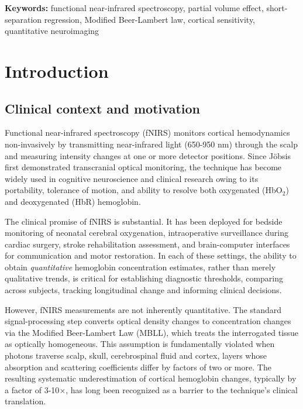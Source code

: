 \documentclass[11pt]{article}
\def\,{ }%
\begin{document}
\vspace{0.5em}\noindent\textbf{Keywords:} functional near-infrared spectroscopy, partial volume effect, short-separation regression, Modified Beer-Lambert law, cortical sensitivity, quantitative neuroimaging
\vspace{0.5em}

\section{Introduction}

\subsection{Clinical context and motivation}

\noindent Functional near-infrared spectroscopy (fNIRS) monitors cortical hemodynamics non-invasively by transmitting near-infrared light (650-950\,nm) through the scalp and measuring intensity changes at one or more detector positions\cite{r1,r2,r3}. Since J\"obsis\cite{r41} first demonstrated transcranial optical monitoring, the technique has become widely used in cognitive neuroscience and clinical research owing to its portability, tolerance of motion, and ability to resolve both oxygenated (HbO$_2$) and deoxygenated (HbR) hemoglobin.

The clinical promise of fNIRS is substantial. It has been deployed for bedside monitoring of neonatal cerebral oxygenation\cite{r4}, intraoperative surveillance during cardiac surgery\cite{r5}, stroke rehabilitation assessment\cite{r6}, and brain-computer interfaces for communication and motor restoration\cite{r7}. In each of these settings, the ability to obtain \textit{quantitative} hemoglobin concentration estimates, rather than merely qualitative trends, is critical for establishing diagnostic thresholds, comparing across subjects, tracking longitudinal change and informing clinical decisions\cite{r8}.

However, fNIRS measurements are not inherently quantitative. The standard signal-processing step converts optical density changes to concentration changes via the Modified Beer-Lambert Law (MBLL)\cite{r9}, which treats the interrogated tissue as optically homogeneous. This assumption is fundamentally violated when photons traverse scalp, skull, cerebrospinal fluid and cortex, layers whose absorption and scattering coefficients differ by factors of two or more\cite{r10,r11,r12}. The resulting systematic underestimation of cortical hemoglobin changes, typically by a factor of 3-10$\times$, has long been recognized as a barrier to the technique's clinical translation\cite{r13}.
\end{document}
